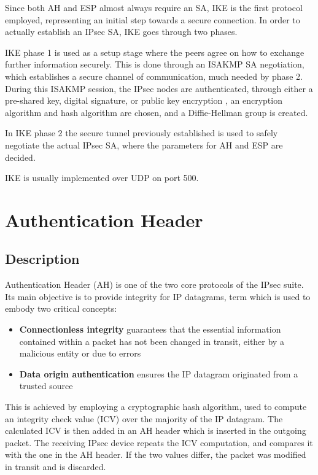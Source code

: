 \documentclass[a4paper,12pt]{report}
\begin{document}
		Since both AH and ESP almost always require an SA, IKE is the first protocol employed, representing an initial step towards a secure connection. In order to actually establish an IPsec SA, IKE goes through two phases. 
		
		IKE phase 1 is used as a setup stage where the peers agree on how to exchange further information securely. This is done through an ISAKMP SA negotiation, which establishes a secure channel of communication, much needed by phase 2. During this ISAKMP session, the IPsec nodes are authenticated, through either a pre-shared key, digital signature, or public key encryption \cite{rfc5996}, an encryption algorithm and hash algorithm are chosen, and a Diffie-Hellman group is created.
		
		In IKE phase 2 the secure tunnel previously established is used to safely negotiate the actual IPsec SA, where the parameters for AH and ESP are decided. 
		
		IKE is usually implemented over UDP on port 500.
		
		\section{Authentication Header}
		\subsection{Description}
		Authentication Header (AH) is one of the two core protocols of the IPsec suite. Its main objective is to provide integrity for IP datagrams, term which is used to embody two critical concepts:
		\begin{itemize}
			\item \textbf{Connectionless integrity} guarantees that the essential information contained within a packet has not been changed in transit, either by a malicious entity or due to errors
			\item \textbf{Data origin authentication} ensures the IP datagram originated from a trusted source
		\end{itemize}
		
		This is achieved by employing a cryptographic hash algorithm, used to compute an integrity check value (ICV) over the majority of the IP datagram. The calculated ICV is then added in an AH header which is inserted in the outgoing packet. The receiving IPsec device repeats the ICV computation, and compares it with the one in the AH header. If the two values differ, the packet was modified in transit and is discarded.
		
\end{document}
